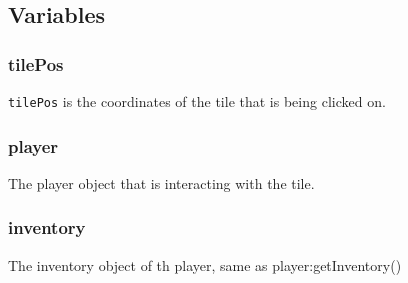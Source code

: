 \documentclass{book}
\begin{document}
\subsection{Variables}
\subsubsection{tilePos}
\texttt{tilePos} is the coordinates of the tile that is being clicked on.

\subsubsection{player}
The player object that is interacting with the tile.

\subsubsection{inventory}
The inventory object of th player, same as player:getInventory()
\end{document}
